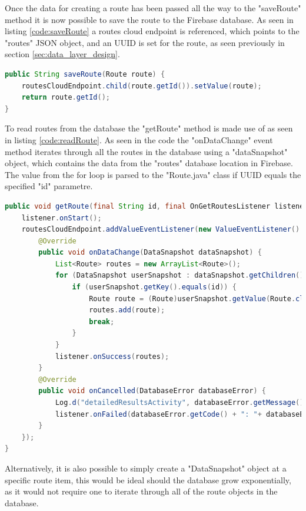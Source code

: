 Once the data for creating a route has been passed all the way to the "saveRoute" method it is now possible to save the route to the Firebase database. As seen in listing \ref{code:saveRoute} a routes cloud endpoint is referenced, which points to the "routes" JSON object, and an UUID is set for the route, as seen previously in section \ref{sec:data_layer_design}.

\begin{lstlisting}[frame=single, language=Java, label={code:saveRoute}, caption={Save route to database}]
public String saveRoute(Route route) {
    routesCloudEndpoint.child(route.getId()).setValue(route);
    return route.getId();
}
\end{lstlisting}

To read routes from the database the "getRoute" method is made use of as seen in listing \ref{code:readRoute}. As seen in the code the "onDataChange" event method iterates through all the routes in the database using a "dataSnapshot" object, which contains the data from the "routes" database location in Firebase. The value from the for loop is parsed to the "Route.java" class if UUID equals the specified "id" parametre. 

\begin{lstlisting}[frame=single, language=Java, label={code:readRoute}, caption={Read routes from database}]
public void getRoute(final String id, final OnGetRoutesListener listener) {
    listener.onStart();
    routesCloudEndpoint.addValueEventListener(new ValueEventListener() {
        @Override
        public void onDataChange(DataSnapshot dataSnapshot) {
            List<Route> routes = new ArrayList<Route>();
            for (DataSnapshot userSnapshot : dataSnapshot.getChildren()) {
                if (userSnapshot.getKey().equals(id)) {
                    Route route = (Route)userSnapshot.getValue(Route.class);
                    routes.add(route);
                    break;
                }
            }
            listener.onSuccess(routes);
        }
        @Override
        public void onCancelled(DatabaseError databaseError) {
            Log.d("detailedResultsActivity", databaseError.getMessage());
            listener.onFailed(databaseError.getCode() + ": "+ databaseError.getMessage());
        }
    });
}
\end{lstlisting}


Alternatively, it is also possible to simply create a "DataSnapshot" object at a specific route item, this would be ideal should the database grow exponentially, as it would not require one to iterate through all of the route objects in the database.



